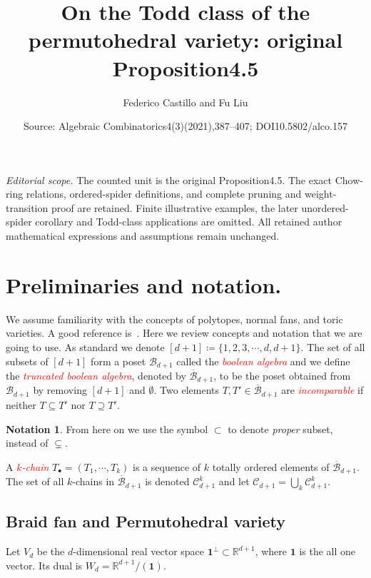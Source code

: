 \documentclass[10pt,a4paper]{amsart}
\title[Ordered-spider Chow-ring expansion]{On the Todd class of the permutohedral variety: original Proposition4.5}
\author{Federico Castillo and Fu Liu}
\date{Source: Algebraic Combinatorics4(3)(2021),387--407; DOI10.5802/alco.157}
\theoremstyle{definition}
\newtheorem{nota}[thm]{Notation}
\newcommand\R{{\mathbb R}}
\newcommand{\important}[1]{\emph{\textcolor{red}{#1}}}
\newcommand{\B}{{\mathcal B}}
\newcommand{\hB}{\overline{\mathcal B}}
\newcommand{\CC}{\mathcal{C}}
\begin{document}
\maketitle
\noindent\textit{Editorial scope.} The counted unit is the original Proposition4.5. The exact Chow-ring relations, ordered-spider definitions, and complete pruning and weight-transition proof are retained. Finite illustrative examples, the later unordered-spider corollary and Todd-class applications are omitted. All retained author mathematical expressions and assumptions remain unchanged.
\setcounter{section}{1}
\setcounter{equation}{4}
\section{Preliminaries and notation.}\label{sec:prelim}
We assume familiarity with the concepts of polytopes, normal fans, and toric varieties. A good reference is~\cite{ewald}. Here we review concepts and notation that we are going to use. As standard we denote $[d+1]\coloneqq \{1,2,3,\cdots,d,d+1\}$. The set of all subsets of $[d+1]$ form a poset $\B_{d+1}$ called the \important{boolean algebra} and we define the \important{truncated boolean algebra}, denoted by $\hB_{d+1}$, to be the poset obtained from $\B_{d+1}$ by removing $[d+1]$ and $\emptyset$. Two elements $T,T'\in \hB_{d+1}$ are \important{incomparable} if neither $T\subseteq T'$ nor $T\supseteq T'$.

\begin{nota}
	From here on we use the symbol $\subset$ to denote \emph{proper} subset, instead of $\subsetneq$.
\end{nota}

A \important{$k$-chain} $T_{\bullet}=(T_1,\cdots,T_k)$ is a sequence of $k$ totally ordered elements of $\hB_{d+1}$.
The set of all $k$-chains in $\hB_{d+1}$ is denoted $\CC_{d+1}^k$ and let $\CC_{d+1}=\bigcup_k \CC_{d+1}^k$.



\subsection{Braid fan and Permutohedral variety}\label{subsec:braid}
Let $V_d$ be the $d$-dimensional real vector space $\mathbf{1}^\perp\subset \R^{d+1}$, where $\mathbf{1}$ is the all one vector. Its dual is $W_d = \R^{d+1}/(\mathbf{1})$. 
\end{document}
